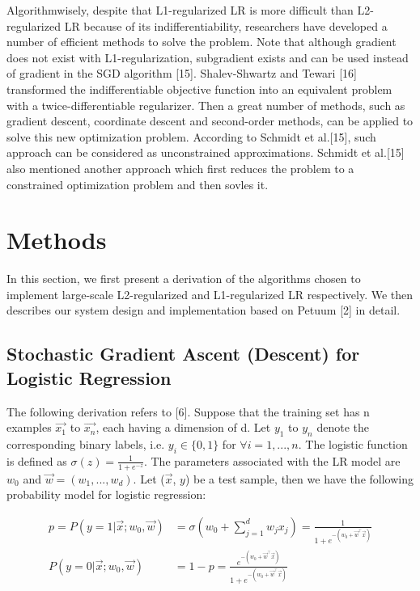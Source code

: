 \documentclass{article} %
\begin{document}
Algorithmwisely, despite that L1-regularized LR is more difficult than L2-regularized LR because of its indifferentiability, researchers have developed a number of efficient methods to solve the problem. Note that although gradient does not exist with L1-regularization, subgradient exists and can be used instead of gradient in the SGD algorithm [15]. Shalev-Shwartz and Tewari [16] transformed the indifferentiable objective function into an equivalent problem with a twice-differentiable regularizer. Then a great number of methods, such as gradient descent, coordinate descent and second-order methods, can be applied to solve this new optimization problem. According to Schmidt et al.[15], such approach can be considered as unconstrained approximations. Schmidt et al.[15] also mentioned another approach which first reduces the problem to a constrained optimization problem and then sovles it.

\section{Methods}
\label{headings}

In this section, we first present a derivation of the algorithms chosen to implement large-scale L2-regularized and L1-regularized LR respectively. We then describes our system design and implementation based on Petuum [2] in detail.

\subsection{Stochastic Gradient Ascent (Descent) for Logistic Regression}

The following derivation refers to [6]. Suppose that the training set has n examples $\vec{x_1}$ to $\vec{x_n}$, each having a dimension of d. Let $y_1$ to $y_n$ denote the corresponding binary labels, i.e. $y_i \in \{0, 1\}$ for $\forall i = 1, ..., n$. The logistic function is defined as $\sigma(z) = \frac{1}{1+e^{-z}}$. The parameters associated with the LR model are $w_0$ and $\vec{w} = (w_1, ..., w_d)$. Let ($\vec{x}$, $y$) be a test sample, then we have the following probability model for logistic regression:

\begin{align*}
    p = P(y=1 | \vec{x}; w_0, \vec{w}) &= \sigma(w_0 + \sum\limits_{j=1}^d w_jx_j) = \frac{1}{1 + e^{-(w_0 + \vec{w}^\top\vec{x})}}\\
    P(y=0 | \vec{x}; w_0, \vec{w}) &= 1 - p = \frac{e^{-(w_0 + \vec{w}^\top\vec{x})}}{1 + e^{-(w_0 + \vec{w}^\top\vec{x})}}
\end{align*}
\end{document}
